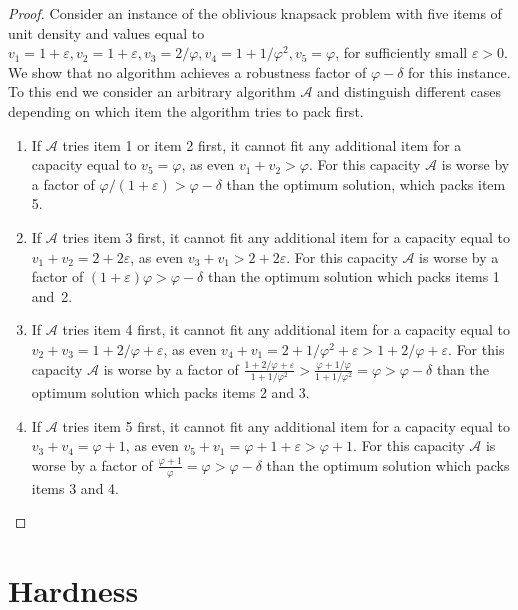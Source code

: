 \documentclass[11pt]{article}
\begin{document}
\begin{proof}
Consider an instance of the oblivious knapsack problem with five items
of unit density and values equal to
$v_{1}=1+\varepsilon,v_{2}=1+\varepsilon,v_{3}=2/\varphi,v_{4}=1+1/\varphi^{2},v_{5}=\varphi$,
for sufficiently small $\varepsilon>0$. We show that no algorithm
achieves a robustness factor of $\varphi-\delta$ for this instance.
To this end we consider an arbitrary algorithm $\mathscr{A}$ and
distinguish different cases depending on which item the algorithm
tries to pack first. 
\renewcommand{\theenumi}{(\alph{enumi})}
\renewcommand{\labelenumi}{\theenumi}

\begin{enumerate}
\item If $\mathscr{A}$ tries item 1 or item 2 first, it cannot fit any
additional item for a capacity equal to $v_{5}=\varphi$, as even
$v_{1}+v_{2}>\varphi$. For this capacity $\mathscr{A}$ is worse
by a factor of $\varphi/(1+\varepsilon)>\varphi-\delta$ than the
optimum solution, which packs item 5. 

\item If $\mathscr{A}$ tries item 3 first, it cannot fit any additional
item for a capacity equal to $v_{1}+v_{2}=2+2\varepsilon$, as even
$v_{3}+v_{1}>2+2\varepsilon$. For this capacity $\mathscr{A}$ is
worse by a factor of $(1+\varepsilon)\varphi>\varphi-\delta$ than
the optimum solution which packs items 1 and~2. 
\item If $\mathscr{A}$ tries item 4 first, it cannot fit any additional
item for a capacity equal to $v_{2}+v_{3}=1+2/\varphi+\varepsilon$,
as even $v_{4}+v_{1}=2+1/\varphi^{2}+\varepsilon>1+2/\varphi+\varepsilon$.
For this capacity $\mathscr{A}$ is worse by a factor of
$\frac{1+2/\varphi+\varepsilon}{1+1/\varphi^{2}}>\frac{\varphi+1/\varphi}{1+1/\varphi^{2}}=\varphi>\varphi-\delta$
than the optimum solution which packs items 2 and 3. 
\item If $\mathscr{A}$ tries item 5 first, it cannot fit any additional
item for a capacity equal to $v_{3}+v_{4}=\varphi+1$, as even $v_{5}+v_{1}=\varphi+1+\varepsilon>\varphi+1$.
For this capacity $\mathscr{A}$ is worse by a factor of $\frac{\varphi+1}{\varphi}=\varphi>\varphi-\delta$
than the optimum solution which packs items 3 and 4.  
\end{enumerate}
\end{proof}


\section{Hardness\label{sec:Hardness}}
\end{document}

